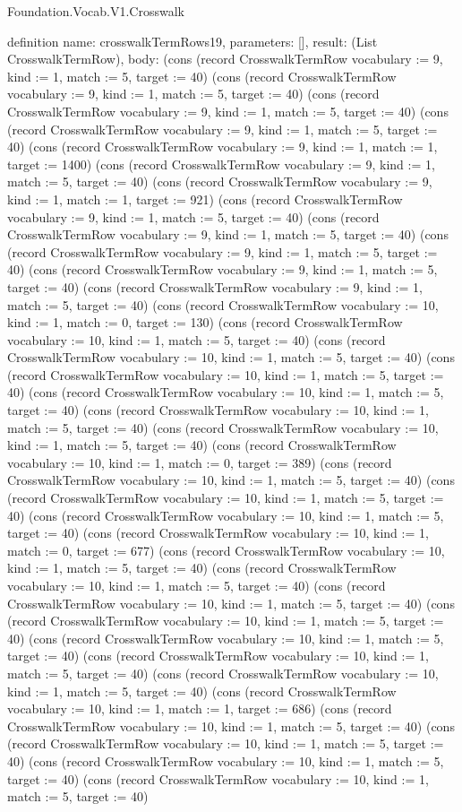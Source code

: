 \begin{lexlean}{Foundation.Vocab.V1.Crosswalk}
\begin{semanticmodule}
definition{
  name: crosswalkTermRows19,
  parameters: [],
  result: (List CrosswalkTermRow),
  body: (cons (record CrosswalkTermRow {vocabulary := 9, kind := 1, match := 5, target := 40}) (cons (record CrosswalkTermRow {vocabulary := 9, kind := 1, match := 5, target := 40}) (cons (record CrosswalkTermRow {vocabulary := 9, kind := 1, match := 5, target := 40}) (cons (record CrosswalkTermRow {vocabulary := 9, kind := 1, match := 5, target := 40}) (cons (record CrosswalkTermRow {vocabulary := 9, kind := 1, match := 1, target := 1400}) (cons (record CrosswalkTermRow {vocabulary := 9, kind := 1, match := 5, target := 40}) (cons (record CrosswalkTermRow {vocabulary := 9, kind := 1, match := 1, target := 921}) (cons (record CrosswalkTermRow {vocabulary := 9, kind := 1, match := 5, target := 40}) (cons (record CrosswalkTermRow {vocabulary := 9, kind := 1, match := 5, target := 40}) (cons (record CrosswalkTermRow {vocabulary := 9, kind := 1, match := 5, target := 40}) (cons (record CrosswalkTermRow {vocabulary := 9, kind := 1, match := 5, target := 40}) (cons (record CrosswalkTermRow {vocabulary := 9, kind := 1, match := 5, target := 40}) (cons (record CrosswalkTermRow {vocabulary := 10, kind := 1, match := 0, target := 130}) (cons (record CrosswalkTermRow {vocabulary := 10, kind := 1, match := 5, target := 40}) (cons (record CrosswalkTermRow {vocabulary := 10, kind := 1, match := 5, target := 40}) (cons (record CrosswalkTermRow {vocabulary := 10, kind := 1, match := 5, target := 40}) (cons (record CrosswalkTermRow {vocabulary := 10, kind := 1, match := 5, target := 40}) (cons (record CrosswalkTermRow {vocabulary := 10, kind := 1, match := 5, target := 40}) (cons (record CrosswalkTermRow {vocabulary := 10, kind := 1, match := 5, target := 40}) (cons (record CrosswalkTermRow {vocabulary := 10, kind := 1, match := 0, target := 389}) (cons (record CrosswalkTermRow {vocabulary := 10, kind := 1, match := 5, target := 40}) (cons (record CrosswalkTermRow {vocabulary := 10, kind := 1, match := 5, target := 40}) (cons (record CrosswalkTermRow {vocabulary := 10, kind := 1, match := 5, target := 40}) (cons (record CrosswalkTermRow {vocabulary := 10, kind := 1, match := 0, target := 677}) (cons (record CrosswalkTermRow {vocabulary := 10, kind := 1, match := 5, target := 40}) (cons (record CrosswalkTermRow {vocabulary := 10, kind := 1, match := 5, target := 40}) (cons (record CrosswalkTermRow {vocabulary := 10, kind := 1, match := 5, target := 40}) (cons (record CrosswalkTermRow {vocabulary := 10, kind := 1, match := 5, target := 40}) (cons (record CrosswalkTermRow {vocabulary := 10, kind := 1, match := 5, target := 40}) (cons (record CrosswalkTermRow {vocabulary := 10, kind := 1, match := 5, target := 40}) (cons (record CrosswalkTermRow {vocabulary := 10, kind := 1, match := 5, target := 40}) (cons (record CrosswalkTermRow {vocabulary := 10, kind := 1, match := 1, target := 686}) (cons (record CrosswalkTermRow {vocabulary := 10, kind := 1, match := 5, target := 40}) (cons (record CrosswalkTermRow {vocabulary := 10, kind := 1, match := 5, target := 40}) (cons (record CrosswalkTermRow {vocabulary := 10, kind := 1, match := 5, target := 40}) (cons (record CrosswalkTermRow {vocabulary := 10, kind := 1, match := 5, target := 40}) }
\end{semanticmodule}
\end{lexlean}
